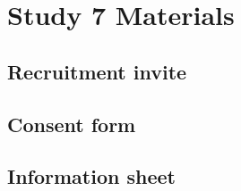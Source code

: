 \chapter{Study 7 Materials}\label{ch:S7_Materials}

\section{Recruitment invite}

\section{Consent form}

\section{Information sheet}


